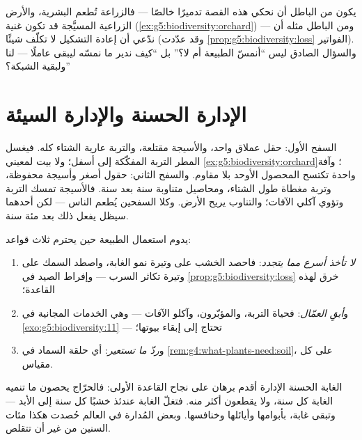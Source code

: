 \begin{remark}\label{rem:g5:people-and-nature:honest}
يكون من الباطل أن نحكي هذه القصة تدميرًا خالصًا --- فالزراعة تُطعم
البشرية، والأرض الزراعية المسيَّجة قد تكون غنية 
(\cref{ex:g5:biodiversity:orchard}) --- ومن الباطل مثله أن ندّعي
أن إعادة التشكيل لا تكلّف شيئًا
(وقد عدّدت \cref{prop:g5:biodiversity:loss} الفواتير). والسؤال
الصادق ليس ``أنمسّ الطبيعة أم لا؟'' بل ``كيف ندير ما نمسّه ليبقى
عاملًا --- لنا ولبقية الشبكة؟''
\end{remark}

\section{الإدارة الحسنة والإدارة السيئة}

\begin{example}\label{ex:g5:people-and-nature:twofarms}
السفح الأول: حقل عملاق واحد، والأسيجة مقتلعة، والتربة عارية الشتاء
كله. فيغسل المطر التربة المفكّكة إلى أسفل؛ ولا بيت لمعيني
\cref{ex:g5:biodiversity:orchard}؛ وآفة واحدة تكتسح المحصول
الأوحد بلا مقاوم. والسفح الثاني: حقول أصغر وأسيجة محفوظة، وتربة
مغطاة طول الشتاء، ومحاصيل متناوبة سنة بعد سنة. فالأسيجة تمسك
التربة وتؤوي آكلي الآفات؛ والتناوب يريح الأرض. وكلا السفحين يُطعم
الناس --- لكن أحدهما سيظل يفعل ذلك بعد مئة سنة.
\end{example}

\begin{proposition}\label{prop:g5:people-and-nature:lasting}
يدوم استعمال الطبيعة حين يحترم ثلاث قواعد:
\begin{enumerate}
  \item \emph{لا تأخذ أسرع مما يتجدد}: فاحصد الخشب على وتيرة نمو
        الغابة، واصطد السمك على وتيرة تكاثر السرب --- وإفراط
        الصيد في \cref{prop:g5:biodiversity:loss} خرق لهذه
        القاعدة؛
  \item و\emph{أبقِ العمّال}: فحياة التربة، والمؤبّرون، وآكلو
        الآفات --- وهي الخدمات المجانية في
        \cref{exo:g5:biodiversity:11} --- تحتاج إلى إبقاء
        بيوتها؛
  \item و\emph{ردّ ما تستعير}: أي حلقة السماد في
        \cref{rem:g4:what-plants-need:soil}، على كل مقياس.
\end{enumerate}
\end{proposition}
\admitted

\begin{example}\label{ex:g5:people-and-nature:forester}
الغابة الحسنة الإدارة أقدم برهان على نجاح القاعدة الأولى: فالحرّاج
يحصون ما تنميه الغابة كل سنة، ولا يقطعون أكثر منه. فتغلّ الغابة
عندئذ خشبًا كل سنة إلى الأبد --- وتبقى غابة، بأبوامها وأيائلها
وخنافسها. وبعض  المُدارة في العالم حُصدت هكذا مئات السنين
من غير أن تتقلص.
\end{example}

